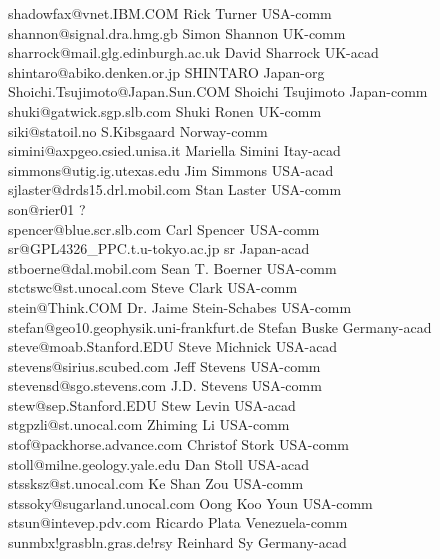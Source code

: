 \begin{tabbing}
shadowfax@vnet.IBM.COM \> Rick Turner \>  USA-comm\\
shannon@signal.dra.hmg.gb \> Simon Shannon \> UK-comm\\
sharrock@mail.glg.edinburgh.ac.uk \> David Sharrock \> UK-acad\\
shintaro@abiko.denken.or.jp \> SHINTARO \> Japan-org\\
Shoichi.Tsujimoto@Japan.Sun.COM \> Shoichi Tsujimoto \> Japan-comm\\
shuki@gatwick.sgp.slb.com \> Shuki Ronen \> UK-comm\\
siki@statoil.no \> S.Kibsgaard \> Norway-comm\\
simini@axpgeo.csied.unisa.it \> Mariella Simini \> Itay-acad\\
simmons@utig.ig.utexas.edu \> Jim Simmons \> USA-acad\\
sjlaster@drds15.drl.mobil.com \> Stan Laster \> USA-comm\\
son@rier01 \> \> ?\\
spencer@blue.scr.slb.com \> Carl Spencer \> USA-comm\\
sr@GPL4326\_PPC.t.u-tokyo.ac.jp \> sr \> Japan-acad\\
stboerne@dal.mobil.com \> Sean T. Boerner \> USA-comm\\
stctswc@st.unocal.com \> Steve Clark \> USA-comm\\
stein@Think.COM \>  Dr. Jaime Stein-Schabes \> USA-comm\\ 
stefan@geo10.geophysik.uni-frankfurt.de \> Stefan Buske \> Germany-acad\\
steve@moab.Stanford.EDU \> Steve Michnick \> USA-acad\\
stevens@sirius.scubed.com  \> Jeff Stevens \> USA-comm\\
stevensd@sgo.stevens.com \> J.D. Stevens \> USA-comm\\
stew@sep.Stanford.EDU \> Stew Levin \> USA-acad\\
stgpzli@st.unocal.com \>  Zhiming Li \> USA-comm\\
stof@packhorse.advance.com    \>   Christof Stork \> USA-comm\\
stoll@milne.geology.yale.edu \> Dan Stoll \> USA-acad\\
stssksz@st.unocal.com \> Ke Shan Zou \> USA-comm\\
stssoky@sugarland.unocal.com \> Oong Koo Youn \> USA-comm\\
stsun@intevep.pdv.com \> Ricardo Plata \> Venezuela-comm\\
sunmbx!grasbln.gras.de!rsy \> Reinhard Sy \> Germany-acad\\

\end{tabbing}
